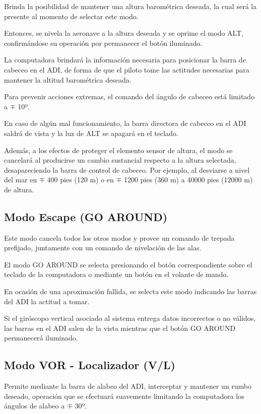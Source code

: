Brinda la posibilidad de mantener una altura barom\'etrica deseada,
la cual ser\'a la presente al momento de selectar este modo.

Entonces, se nivela la aeronave a la altura deseada y se oprime
el modo ALT, confirm\'andose su operaci\'on por permanecer el 
bot\'on iluminado.

La computadora brindar\'a la informaci\'on necesaria para
posicionar la barra de cabeceo en el ADI, de forma de 
que el piloto tome las actitudes necesarias para mantener
la altitud barom\'etrica deseada.

Para prevenir acciones extremas, el comando del \'angulo de
cabeceo est\'a limitado a $\mp$ 10º.

En caso de alg\'un mal funcionamiento, la barra directora
de cabeceo en el ADI saldr\'a de vista y la luz de ALT
se apagar\'a en el teclado.

Adem\'as, a los efectos de proteger el elemento sensor de altura,
el modo se cancelar\'a al producirse un cambio sustancial respecto
a la altura selectada, desapareciendo la barra de control
de cabeceo.
Por ejemplo, al desviarse a nivel del mar en $\mp$ 400 pies (120 m)
o en $\mp$ 1200 pies (360 m) a 40000 pies (12000 m) de altura. 


\subsection{Modo Escape (GO AROUND)}
\label{sec:go.araund}

Este modo cancela todos los otros modos y provee un comando de trepada
prefijado, juntamente con un comando de nivelaci\'on de las alas.

El modo GO AROUND se selecta presionando el bot\'on correspondiente
sobre el teclado de la computadora o mediante un bot\'on en el
volante de mando.

En ocasi\'on de una aproximaci\'on fallida, se selecta este modo
indicando las barras del ADI la actitud a tomar.

Si el gir\'oscopo vertical asociado al sistema entrega datos
incorrectos o no v\'alidos, las barras en el ADI salen de
la vista mientras que el bot\'on GO AROUND permanecer\'a iluminado.


\subsection{Modo VOR - Localizador (V/L)}
\label{sec:V_L}

Permite mediante la barra de alabeo del ADI, interceptar y mantener
un rumbo deseado, operaci\'on que se efectuar\'a suavemente
limitando la computadora los \'angulos de alabeo a $\mp$ 30º.

